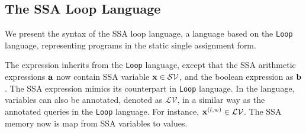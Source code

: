 \subsection{ The SSA Loop Language }
We present the syntax of the SSA loop language, a language based on the {\tt Loop} language, representing programs in the static single assignment form.

The expression inherits from the {\tt Loop} language, except that the SSA arithmetic expressions ${\bf{{a}}}$ now contain SSA variable ${\bf{{x}}} \in \mathcal{SV}$, and the boolean expression as ${\bf{{b}}}$. The SSA expression mimics its counterpart in {\tt Loop} language. In the language, variables can also be annotated, denoted as $\mathcal{LV}$, in a similar way as the annotated queries in the {\tt Loop} language. For instance, ${\bf{{x}}}^{(l,w)} \in  \mathcal{LV}$. The SSA memory now is map from SSA variables to values.
%

